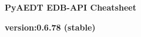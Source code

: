 \documentclass[landscape]{article}
\begin{document}
\raggedright
\footnotesize
\begin{center}
     \Huge{\textbf{PyAEDT EDB-API Cheatsheet}} \\
\end{center}
\begin{center}
\small{\textbf{version:0.6.78 (stable) }} \\
\end{center}
\vspace{-0.15cm}
\noindent\makebox[\linewidth]{\rule{\paperwidth}{2pt}}
\end{document}
